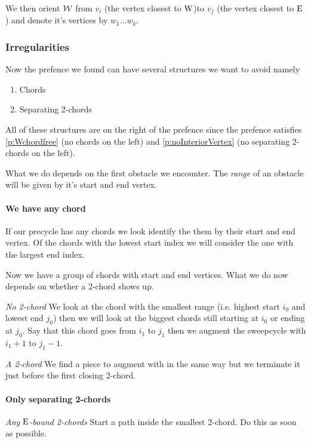     We then orient $\mathcal{W}$ from $v_i$ (the vertex closest to $\mathrm{W}$)to $v_j$ (the vertex closest to $\mathrm{E}$) and denote it's vertices by $w_1 \ldots w_k$.


    \subsubsection{Irregularities}
      Now the prefence we found can have several structures we want to avoid
      namely
      \begin{enumerate}
        \itemsep=-4pt
        \item Chords
        \item Separating 2-chords
      \end{enumerate}

      All of these structures are on the right of the prefence since the prefence satisfies \ref{p:Wchordfree} (no chords on the left) and \ref{p:noInteriorVertex} (no separating 2-chords on the left).

      What we do depends on the first obstacle we encounter. The \emph{range} of an obstacle will be given by it's start and end vertex.

      \paragraph{We have any chord}
      If our precycle has any chords we look identify the them by their start and end vertex. Of the chords with the lowest start index we will consider the one with the largest end index.

      Now we have a group of chords with start and end vertices. What we do now depends on whether a 2-chord shows up.

      \emph{No 2-chord}
      We look at the chord with the smallest range (i.e. highest start $i_0$ and lowest end $j_0$) then we will look at the biggest chords still starting at $i_0$ or ending at $j_0$. Say that this chord goes from $i_1$ to $j_1$ then we augment the sweepcycle with $i_1 +1$ to $j_1 -1$.

      \emph{A 2-chord}
      We find a piece to augment with in the same way  but we terminate it just before the first closing 2-chord.

      \paragraph{Only separating 2-chords}
      \emph{Any $\mathrm{E}$-bound 2-chords} 
      Start a path inside the smallest 2-chord. Do this as soon as possible.

